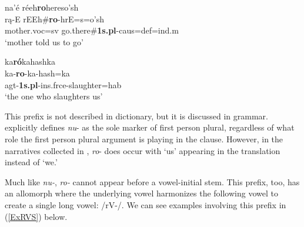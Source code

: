 \begin{exe}
\begin{xlist}
	\item \glll na'é réeh\textbf{ro}hereso'sh\\
	rą-E rEEh\#\textbf{ro}-hrE=s=o'sh\\
	\textnormal{mother}.voc=sv \textnormal{go.there}\#\textbf{1s.pl}-caus=def=ind.m\\
	\glt `mother told us to go' \citep[166]{hollow1973a}
	
	\item \glll ka\textbf{ró}kahashka\\
	ka-\textbf{ro}-ka-hash=ka\\
	agt-\textbf{1s.pl}-ins.frce-\textnormal{slaughter}=hab\\
	\glt `the one who slaughters us' \citep[146]{hollow1973a}
	
	\end{xlist}

\end{exe}

This prefix is not described in  dictionary, but it is discussed in  grammar. \citeauthor{hollow1970} explicitly defines \textit{nu}- as the sole marker of first person plural, regardless of what role the first person plural argument is playing in the clause. However, in the narratives collected in \citet{hollow1973a,hollow1973b}, \textit{ro}- does occur with `us' appearing in the translation instead of `we.'


Much like \textit{nu-}, \textit{ro-} cannot appear before a vowel-initial stem. This prefix, too, has an allomorph where the underlying vowel harmonizes the following vowel to create a single long vowel: /rV-/. We can see examples involving this prefix in (\ref{ExRVS}) below.

